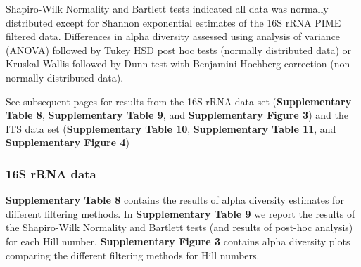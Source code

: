 \documentclass[
  10pt,
  letterpaper,
  DIV=11,
  numbers=noendperiod]{scrartcl}
\begin{document}
Shapiro-Wilk Normality and Bartlett tests indicated all data was
normally distributed except for Shannon exponential estimates of the 16S
rRNA PIME filtered data. Differences in alpha diversity assessed using
analysis of variance (ANOVA) followed by Tukey HSD post hoc tests
(normally distributed data) or Kruskal-Wallis followed by Dunn test with
Benjamini-Hochberg correction (non-normally distributed data).

See subsequent pages for results from the 16S rRNA data set
(\textbf{Supplementary Table 8}, \textbf{Supplementary Table 9}, and
\textbf{Supplementary Figure 3}) and the ITS data set
(\textbf{Supplementary Table 10}, \textbf{Supplementary Table 11}, and
\textbf{Supplementary Figure 4})

\newpage{}

\hypertarget{s-rrna-data-2}{%
\subsubsection{16S rRNA data}\label{s-rrna-data-2}}

\textbf{Supplementary Table 8} contains the results of alpha diversity
estimates for different filtering methods. In \textbf{Supplementary
Table 9} we report the results of the Shapiro-Wilk Normality and
Bartlett tests (and results of post-hoc analysis) for each Hill number.
\textbf{Supplementary Figure 3} contains alpha diversity plots comparing
the different filtering methods for Hill numbers.
\end{document}
